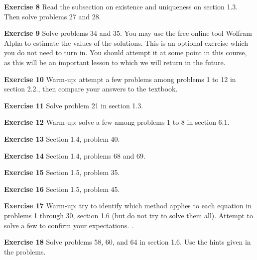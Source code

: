 \documentclass[12pt,oneside]{exam}
\newenvironment{exercise}[1]{\vspace{.1in}\noindent\textbf{Exercise #1 \hspace{.05em}}}{}
\begin{document}
\begin{exercise}{8}
Read the subsection on existence and uniqueness on section 1.3. Then solve problems 27 and 28. 
\end{exercise}

\begin{exercise}{9}
Solve problems 34 and 35. You may use the free online tool Wolfram Alpha to estimate the values of the solutions. This is an optional exercise which you do not need to turn in. You should attempt it at some point in this course, as this will be an important lesson to which we will return in the future. 
\end{exercise}

\begin{exercise}{10}
Warm-up: attempt a few problems among problems 1 to 12 in section 2.2., then compare your answers to the textbook. 
\end{exercise}

\begin{exercise}{11}
Solve problem 21 in section 1.3. 
\end{exercise}

\begin{exercise}{12}
Warm-up: solve a few among problems 1 to 8 in section 6.1. 
\end{exercise}

\begin{exercise}{13}
Section 1.4, problem 40. 
\end{exercise}

\begin{exercise}{14}
Section 1.4, problems 68 and 69. 
\end{exercise}

\begin{exercise}{15}
Section 1.5, problem 35. 
\end{exercise}

\begin{exercise}{16}
Section 1.5, problem 45. 
\end{exercise}

\begin{exercise}{17}
Warm-up: try to identify which method applies to each equation in problems 1 through 30, section 1.6 (but do not try to solve them all). Attempt to solve a few to confirm your expectations. 
\end{exercise}.

\begin{exercise}{18}
Solve problems 58, 60, and 64 in section 1.6. Use the hints given in the problems. 
\end{exercise}
\end{document}
